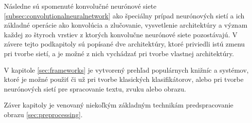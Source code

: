 Následne sú spomenuté konvolučné neurónové siete \ref{subsec:convolutionalneuralnetwork} ako špeciálny prípad neurónových sietí a ich základné operácie ako konvolúcia a zlučovanie,
    vysvetlenie architektúry a význam každej zo štyroch vrstiev z ktorých konvolučne neurónové siete pozostávajú.
V závere tejto podkapitoly sú popísané dve architektúry, ktoré priviedli istú zmenu pri tvorbe sietí, a je možné z nich vychádzať pri tvorbe vlastnej architektúry.

V kapitole \ref{sec:frameworks} je vytvorený prehľad populárnych knižníc a systémov, ktoré je možné použiť či už pri tvorbe klasických klasifikátorov, alebo
    pri tvorbe neurónových sietí pre spracovanie textu, zvuku alebo obrazu.

Záver kapitoly je venovaný niekoľkým základným technikám predspracovanie obrazu \ref{sec:preprocessing}.

